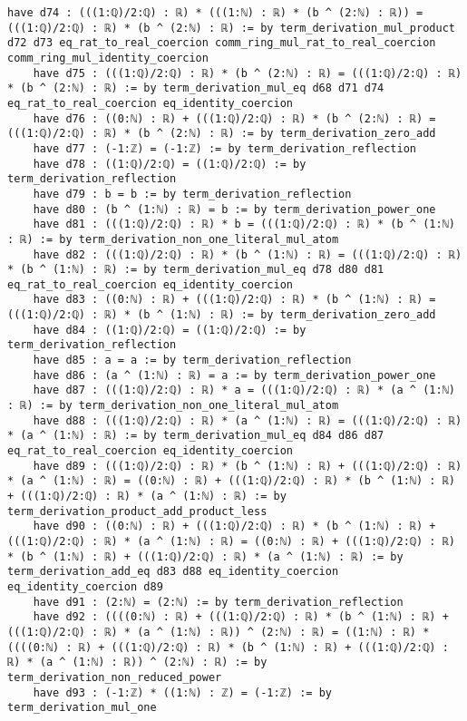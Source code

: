 \documentclass{article}
\begin{document}
\begin{tcolorbox}[colback=white!10, width=\linewidth]
\begin{lstlisting}[language=Lean4]
    have d74 : (((1:ℚ)/2:ℚ) : ℝ) * (((1:ℕ) : ℝ) * (b ^ (2:ℕ) : ℝ)) = (((1:ℚ)/2:ℚ) : ℝ) * (b ^ (2:ℕ) : ℝ) := by term_derivation_mul_product d72 d73 eq_rat_to_real_coercion comm_ring_mul_rat_to_real_coercion comm_ring_mul_identity_coercion
    have d75 : (((1:ℚ)/2:ℚ) : ℝ) * (b ^ (2:ℕ) : ℝ) = (((1:ℚ)/2:ℚ) : ℝ) * (b ^ (2:ℕ) : ℝ) := by term_derivation_mul_eq d68 d71 d74 eq_rat_to_real_coercion eq_identity_coercion
    have d76 : ((0:ℕ) : ℝ) + (((1:ℚ)/2:ℚ) : ℝ) * (b ^ (2:ℕ) : ℝ) = (((1:ℚ)/2:ℚ) : ℝ) * (b ^ (2:ℕ) : ℝ) := by term_derivation_zero_add
    have d77 : (-1:ℤ) = (-1:ℤ) := by term_derivation_reflection
    have d78 : ((1:ℚ)/2:ℚ) = ((1:ℚ)/2:ℚ) := by term_derivation_reflection
    have d79 : b = b := by term_derivation_reflection
    have d80 : (b ^ (1:ℕ) : ℝ) = b := by term_derivation_power_one
    have d81 : (((1:ℚ)/2:ℚ) : ℝ) * b = (((1:ℚ)/2:ℚ) : ℝ) * (b ^ (1:ℕ) : ℝ) := by term_derivation_non_one_literal_mul_atom
    have d82 : (((1:ℚ)/2:ℚ) : ℝ) * (b ^ (1:ℕ) : ℝ) = (((1:ℚ)/2:ℚ) : ℝ) * (b ^ (1:ℕ) : ℝ) := by term_derivation_mul_eq d78 d80 d81 eq_rat_to_real_coercion eq_identity_coercion
    have d83 : ((0:ℕ) : ℝ) + (((1:ℚ)/2:ℚ) : ℝ) * (b ^ (1:ℕ) : ℝ) = (((1:ℚ)/2:ℚ) : ℝ) * (b ^ (1:ℕ) : ℝ) := by term_derivation_zero_add
    have d84 : ((1:ℚ)/2:ℚ) = ((1:ℚ)/2:ℚ) := by term_derivation_reflection
    have d85 : a = a := by term_derivation_reflection
    have d86 : (a ^ (1:ℕ) : ℝ) = a := by term_derivation_power_one
    have d87 : (((1:ℚ)/2:ℚ) : ℝ) * a = (((1:ℚ)/2:ℚ) : ℝ) * (a ^ (1:ℕ) : ℝ) := by term_derivation_non_one_literal_mul_atom
    have d88 : (((1:ℚ)/2:ℚ) : ℝ) * (a ^ (1:ℕ) : ℝ) = (((1:ℚ)/2:ℚ) : ℝ) * (a ^ (1:ℕ) : ℝ) := by term_derivation_mul_eq d84 d86 d87 eq_rat_to_real_coercion eq_identity_coercion
    have d89 : (((1:ℚ)/2:ℚ) : ℝ) * (b ^ (1:ℕ) : ℝ) + (((1:ℚ)/2:ℚ) : ℝ) * (a ^ (1:ℕ) : ℝ) = ((0:ℕ) : ℝ) + (((1:ℚ)/2:ℚ) : ℝ) * (b ^ (1:ℕ) : ℝ) + (((1:ℚ)/2:ℚ) : ℝ) * (a ^ (1:ℕ) : ℝ) := by term_derivation_product_add_product_less
    have d90 : ((0:ℕ) : ℝ) + (((1:ℚ)/2:ℚ) : ℝ) * (b ^ (1:ℕ) : ℝ) + (((1:ℚ)/2:ℚ) : ℝ) * (a ^ (1:ℕ) : ℝ) = ((0:ℕ) : ℝ) + (((1:ℚ)/2:ℚ) : ℝ) * (b ^ (1:ℕ) : ℝ) + (((1:ℚ)/2:ℚ) : ℝ) * (a ^ (1:ℕ) : ℝ) := by term_derivation_add_eq d83 d88 eq_identity_coercion eq_identity_coercion d89
    have d91 : (2:ℕ) = (2:ℕ) := by term_derivation_reflection
    have d92 : ((((0:ℕ) : ℝ) + (((1:ℚ)/2:ℚ) : ℝ) * (b ^ (1:ℕ) : ℝ) + (((1:ℚ)/2:ℚ) : ℝ) * (a ^ (1:ℕ) : ℝ)) ^ (2:ℕ) : ℝ) = ((1:ℕ) : ℝ) * ((((0:ℕ) : ℝ) + (((1:ℚ)/2:ℚ) : ℝ) * (b ^ (1:ℕ) : ℝ) + (((1:ℚ)/2:ℚ) : ℝ) * (a ^ (1:ℕ) : ℝ)) ^ (2:ℕ) : ℝ) := by term_derivation_non_reduced_power
    have d93 : (-1:ℤ) * ((1:ℕ) : ℤ) = (-1:ℤ) := by term_derivation_mul_one

\end{lstlisting}
\end{tcolorbox}
\end{document}
